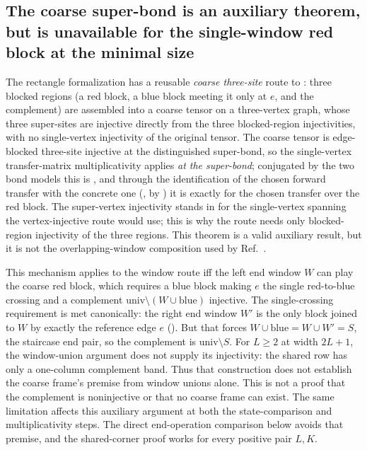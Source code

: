 \documentclass{article}
\begin{document}
\subsection{The coarse super-bond is an auxiliary theorem, but is unavailable
    for the single-window red block at the minimal size}

The rectangle formalization has a reusable \emph{coarse three-site} route to
: three
blocked regions (a red block, a blue block meeting it only at $e$, and the
complement) are assembled into a coarse tensor on a three-vertex graph, whose three
super-sites are injective directly from the three blocked-region injectivities, with
no single-vertex injectivity of the original tensor. The coarse tensor is
edge-blocked three-site injective at the distinguished super-bond, so the
single-vertex transfer-matrix multiplicativity 
applies \emph{at the super-bond}; conjugated by the two bond models this is
, and through the identification of the chosen forward
transfer with the concrete one (, by
) it is exactly  for the chosen
transfer over the red block. The super-vertex injectivity stands in for the
single-vertex spanning the vertex-injective route would use; this is why the route
needs only blocked-region injectivity of the three regions.  This theorem is a
valid auxiliary result, but it is not the overlapping-window composition used
by Ref.~\cite{Molnar2018NormalPEPS}.

This mechanism applies to the window route iff the left end window $W$ can play the
coarse red block, which requires a blue block making $e$ the single red-to-blue
crossing and a complement $\mathrm{univ}\setminus(W\cup\mathrm{blue})$ injective. The
single-crossing requirement is met canonically: the right end window $W'$ is the only
block joined to $W$ by exactly the reference edge $e$
(). But that forces
$W\cup\mathrm{blue} = W\cup W' = S$, the staircase end pair, so the complement is
$\mathrm{univ}\setminus S$. For $L\geq2$ at width $2L+1$, the
window-union argument does not supply its injectivity: the shared row has
only a one-column complement band. Thus that construction does not
establish the coarse frame's  premise
from window unions alone. This is not a proof that the complement is
noninjective or that no coarse frame can exist. The same limitation affects
this auxiliary argument at both the state-comparison and multiplicativity
steps. The direct end-operation comparison below avoids that premise,
and the shared-corner proof works for every positive pair $L,K$.
\end{document}
